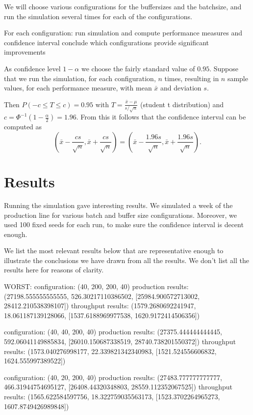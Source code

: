 \documentclass{report}
\begin{document}
We will choose various configurations for the buffersizes and the batchsize, and run the simulation several times for each of the configurations.

For each configuration:
    run simulation and compute performance measures and confidence interval
    conclude which configurations provide significant improvements


As confidence level $1 - \alpha$ we choose the fairly standard value of $0.95$.
Suppose that we run the simulation, for each configuration, $n$ times, resulting in $n$ sample values, for each performance measure, with mean $\bar{x}$ and deviation $s$.

Then $P(-c \leq T \leq c) = 0.95 $ with $T = \frac{\bar{x} - \mu}{s/\sqrt{n}}$ (student t distribution) and $c = \Phi ^{-1} (1 - \frac{\alpha}{2})= 1.96$.
From this it follows that the confidence interval can be computed as
\[ (\bar{x} - \frac{cs}{\sqrt{n}}, \bar{x} + \frac{cs}{\sqrt{n}}) =
(\bar{x} - \frac{1.96s}{\sqrt{n}}, \bar{x} + \frac{1.96s}{\sqrt{n}}). \]


\section{Results}
Running the simulation gave interesting results.
We simulated a week of the production line for various batch and buffer size configurations.
Moreover, we used 100 fixed seeds for each run, to make sure the confidence interval is decent enough.

We list the most relevant results below that are representative enough to illustrate the conclusions we have drawn from all the results. We don't list all the results here for reasons of clarity.

WORST:
configuration: (40, 200, 200, 40)
production results: (27198.555555555555, 526.30217110386502, [25984.900572713002, 28412.210538398107])
throughput results: (1579.2680692241947, 18.061187139128066, [1537.6188969977538, 1620.9172414506356])

configuration: (40, 40, 200, 40)
production results: (27375.444444444445, 592.06041149885834, [26010.150687338519, 28740.738201550372])
throughput results: (1573.040276998177, 22.339821342340983, [1521.524556606832, 1624.555997389522])

configuration: (40, 20, 200, 40)
production results: (27483.777777777777, 466.31944754695127, [26408.44320348803, 28559.112352067525])
throughput results: (1565.622584597756, 18.322759035563173, [1523.3702264965273, 1607.8749426989848])
\end{document}
